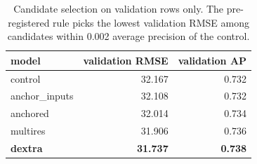 \begin{table}[t]
\centering
\caption{Candidate selection on validation rows only. The pre-registered rule picks the lowest validation RMSE among candidates within 0.002 average precision of the control.}
\label{tab:selection}
\begin{tabular}{lrr}
\toprule
model & validation RMSE & validation AP \\
\midrule
control & 32.167 & 0.732 \\
anchor\_inputs & 32.108 & 0.732 \\
anchored & 32.014 & 0.734 \\
multires & 31.906 & 0.736 \\
\textbf{dextra} & \textbf{31.737} & \textbf{0.738} \\
\bottomrule
\end{tabular}
\end{table}
